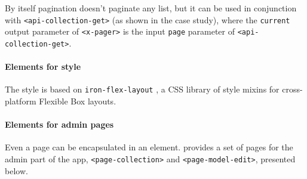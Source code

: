 By itself pagination doesn't paginate any list, but it can be used in conjunction with \texttt{<api-collection-get>} (as shown in the case study), where the \texttt{current} output parameter of \texttt{<x-pager>} is the input \texttt{page} parameter of \texttt{<api-collection-get>}.

\paragraph{Elements for style}

The style is based on \texttt{iron-flex-layout} \cite{iron-elements}, a CSS library of style mixins for cross-platform Flexible Box layouts.

\paragraph{Elements for admin pages}

Even a page can be encapsulated in an element.  provides a set of pages for the admin part of the app, \texttt{<page-collection>} and \texttt{<page-model-edit>}, presented below.


